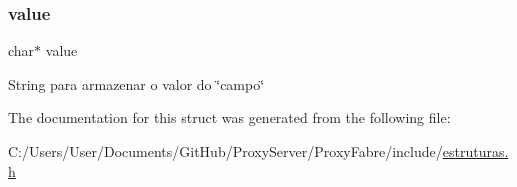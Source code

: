 \mbox{\label{structheaderList_a4e9aec275e566b978a3ccb4e043d8c61}} 
\subsubsection{\texorpdfstring{value}{value}}
{\footnotesize\ttfamily char$\ast$ value}

String para armazenar o valor do \char`\"{}campo\char`\"{} 

The documentation for this struct was generated from the following file\+:\begin{DoxyCompactItemize}
\item 
C\+:/\+Users/\+User/\+Documents/\+Git\+Hub/\+Proxy\+Server/\+Proxy\+Fabre/include/\hyperlink{estruturas_8h}{estruturas.\+h}\end{DoxyCompactItemize}
